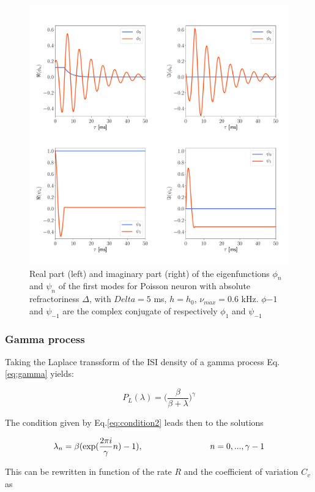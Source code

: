 \documentclass[a4paper,11pt,twoside]{article}
\numberwithin{equation}{section}
\begin{document}
\begin{figure}
	\centering
	\includegraphics[width=0.8\linewidth]{poisson_eigenfunction.pdf}
	\caption{Real part (left) and imaginary part (right) of the eigenfunctions $\phi_n$ and $\psi_n$ of the first modes for Poisson neuron with absolute refractoriness $\Delta$, with $Delta=5$ ms, $h=h_0$, $\nu_{max}=0.6$ kHz. $\phi{-1}$ and $\psi_{-1}$  are the complex conjugate of respectively $\phi_{1}$ and $\psi_{-1}$ }
	\label{fig:poissoneigenfunction}
\end{figure}


\subsubsection{Gamma process}

Taking the Laplace transsform of the ISI density of a gamma process Eq. \eqref{eq:gamma} yields:

\begin{equation}
P_L(\lambda)=\big(\frac{\beta}{\beta +\lambda}\big)^\gamma
\end{equation}


The condition given by Eq.\eqref{eq:condition2} leads then to the solutions


\begin{equation}
\lambda_n=\beta(\exp(\frac{2\pi i}{\gamma}n)-1), \hspace{2.8cm}  n=0,..., \gamma-1
\end{equation}

This can be rewritten in function of the rate $R$ and the coefficient of variation $C_v$ as
\end{document}
